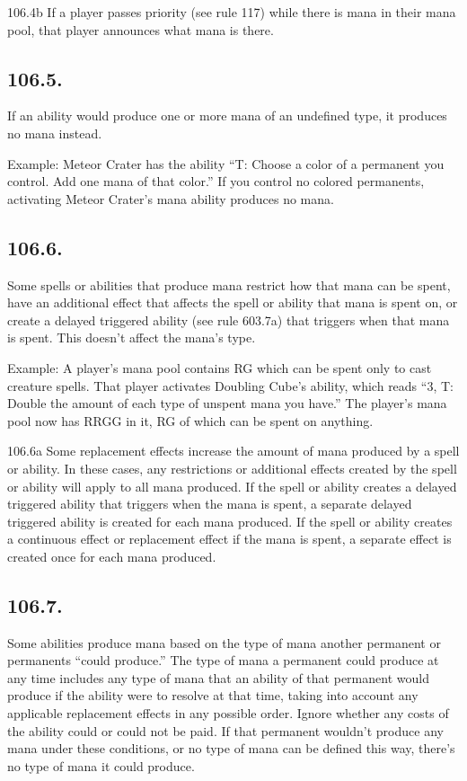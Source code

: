 106.4b If a player passes priority (see rule 117) while there is mana in their mana pool, that player announces what mana is there.

\subsection*{106.5.}
If an ability would produce one or more mana of an undefined type, it produces no mana instead.

Example: Meteor Crater has the ability “{T}: Choose a color of a permanent you control. Add one mana of that color.” If you control no colored permanents, activating Meteor Crater’s mana ability produces no mana.

\subsection*{106.6.}
Some spells or abilities that produce mana restrict how that mana can be spent, have an additional effect that affects the spell or ability that mana is spent on, or create a delayed triggered ability (see rule 603.7a) that triggers when that mana is spent. This doesn’t affect the mana’s type.

Example: A player’s mana pool contains {R}{G} which can be spent only to cast creature spells. That player activates Doubling Cube’s ability, which reads “{3}, {T}: Double the amount of each type of unspent mana you have.” The player’s mana pool now has {R}{R}{G}{G} in it, {R}{G} of which can be spent on anything.

106.6a Some replacement effects increase the amount of mana produced by a spell or ability. In these cases, any restrictions or additional effects created by the spell or ability will apply to all mana produced. If the spell or ability creates a delayed triggered ability that triggers when the mana is spent, a separate delayed triggered ability is created for each mana produced. If the spell or ability creates a continuous effect or replacement effect if the mana is spent, a separate effect is created once for each mana produced.

\subsection*{106.7.}
Some abilities produce mana based on the type of mana another permanent or permanents “could produce.” The type of mana a permanent could produce at any time includes any type of mana that an ability of that permanent would produce if the ability were to resolve at that time, taking into account any applicable replacement effects in any possible order. Ignore whether any costs of the ability could or could not be paid. If that permanent wouldn’t produce any mana under these conditions, or no type of mana can be defined this way, there’s no type of mana it could produce.

